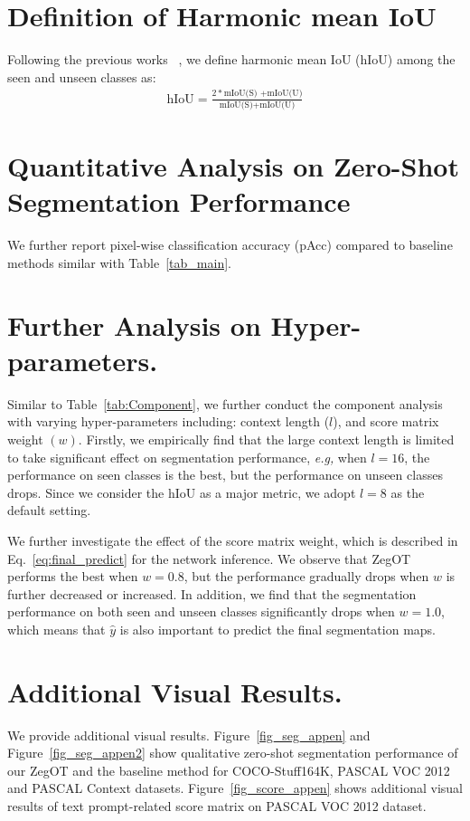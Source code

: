 \documentclass[nohyperref]{article}
\theoremstyle{plain}
\theoremstyle{definition}
\theoremstyle{remark}
\begin{document}
\section{Definition of Harmonic mean IoU}
\label{appendix:hIoU}
Following the previous works ~\cite{xu2021zsseg,zhou2022maskclip,zhou2022zegclip}, we define harmonic mean IoU (hIoU) among the seen and unseen classes as:
\begin{align}
    \text{hIoU} =\frac{2 * \text{mIoU(S) +mIoU(U)}}{\text{mIoU(S)+mIoU(U)}}
\end{align}


\section{Quantitative Analysis on Zero-Shot Segmentation Performance}
\label{appendix:pAcc}
We further report pixel-wise classification accuracy (pAcc) compared to baseline methods similar with Table~\ref{tab_main}.


\section{Further Analysis on Hyper-parameters.}
\label{appendix:compo}
Similar to Table~\ref{tab:Component}, we further conduct the component analysis with varying hyper-parameters including: context length ($l$), and score matrix weight $(w)$.
Firstly, we empirically find that the large context length is limited to take %
significant effect on segmentation performance, \textit{e.g,} when $l=16$, the performance on seen classes is the best, but the performance on unseen classes drops. Since we consider the hIoU as a major metric, we adopt $l=8$ as the default setting. 

We further investigate the effect of the score matrix 
weight, which is described in Eq.~\eqref{eq:final_predict} for the network inference.
We observe that ZegOT performs the best when $w = 0.8$, but the performance gradually drops when $w$ is further decreased or increased. In addition, we find that the segmentation performance on both seen and unseen classes significantly drops when $w=1.0$, which means that $\hat y$ is also important to predict the final segmentation maps. 








\section{Additional Visual Results.}
\label{appen_fig}
We provide additional visual results. Figure~\ref{fig_seg_appen} and Figure~\ref{fig_seg_appen2} show
qualitative zero-shot segmentation performance of our ZegOT and the baseline method for COCO-Stuff164K, PASCAL VOC 2012 and PASCAL Context datasets. 
Figure~\ref{fig_score_appen} shows additional visual results of text prompt-related score matrix on PASCAL VOC 2012 dataset.
\end{document}
